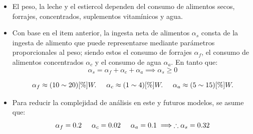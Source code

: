 \begin{itemize}
    \item El peso, la leche y el estiercol dependen del consumo de alimentos secos, forrajes, concentrados, suplementos vitamínicos y agua.
    \item Con base en el item anterior, la ingesta neta de alimentos $\alpha_{s}$ consta de la ingesta de alimento que puede representarse mediante parámetros proporcionales al peso; siendo estos el consumo de forrajes $\alpha_{f}$, el consumo de alimentos concentrados $\alpha_{c}$ y el consumo de agua $\alpha_{a}$. En tanto que:
    \begin{equation}
        \alpha_{s} = \alpha_{f} + \alpha_{c} + \alpha_{a} \implies \alpha_{s} \geq 0
    \end{equation}

    \begin{equation*}
        \alpha_{f} \approx (10\sim 20)[\%]W. \hspace{0.5cm} \alpha_{c} \approx (1\sim 4)[\%]W. \hspace{0.5cm} \alpha_{a} \approx (5\sim 15)[\%]W.
    \end{equation*}

    \item Para reducir la complejidad de análisis en este y futuros modelos, se asume que:
    \begin{equation*}
       \alpha_{f} = 0.2 \hspace{0.5cm} \alpha_{c} = 0.02 \hspace{0.5cm} \alpha_{a} = 0.1 \implies \therefore \alpha_{s} = 0.32 
    \end{equation*}
    
\end{itemize}

